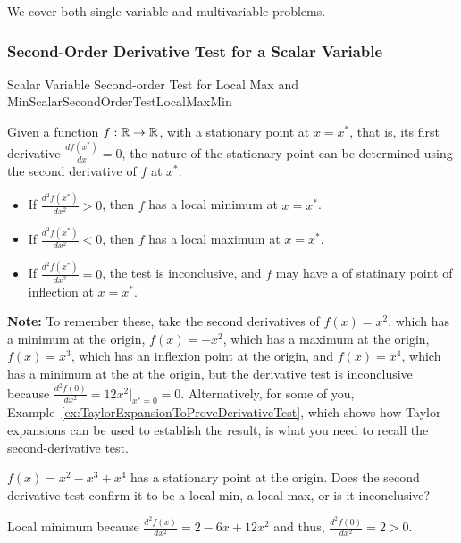 We cover both single-variable and multivariable problems.


\subsubsection{Second-Order Derivative Test for a Scalar Variable}

\begin{propColor}{Scalar Variable Second-order Test for Local Max and Min}{ScalarSecondOrderTestLocalMaxMin}

Given a function $f:\mathbb R \to \mathbb R$, with a stationary point at \(x = x^\ast\), that is, its first derivative $\frac{df(x^\ast)}{dx} = 0$, the nature of the stationary point can be determined using the second derivative of \(f\) at \(x^\ast\).

\begin{itemize}
    \item If \(\frac{d^2f(x^\ast)}{dx^2} > 0\), then \(f\) has a local minimum at \(x = x^\ast\).
    \item If \(\frac{d^2f(x^\ast)}{dx^2} < 0\), then \(f\) has a local maximum at \(x = x^\ast\).
    \item If \(\frac{d^2f(x^\ast)}{dx^2} = 0\), the test is inconclusive, and \(f\) may have a of statinary point of inflection at \(x = x^\ast\).
\end{itemize}
\bigskip
\textbf{Note:} To remember these, take the second derivatives of $f(x) = x^2$, which has a minimum at the origin, $f(x) = -x^2$, which has a maximum at the origin, $f(x) = x^3$, which has an inflexion point at the origin, and  $f(x) = x^4$, which has a minimum at the at the origin, but the derivative test is inconclusive because $\frac{d^2f(0)}{dx^2} = 12 x^2\big|_{x^\ast = 0} = 0$. Alternatively, for some of you, Example~\ref{ex:TaylorExpansionToProveDerivativeTest}, which shows how Taylor expansions can be used to establish the result, is what you need to recall the second-derivative test.
    
\end{propColor}

\bigskip

\begin{example} \(f(x) = x^2 -x^3 + x^4\) has a stationary point at the origin.
Does the second derivative test confirm it to be a local min, a local max, or is it inconclusive?    
\end{example}
\solution \Ans Local minimum because $\frac{d^2f(x)}{dx^2} = 2 -6x + 12x^2$ and thus, $\frac{d^2f(0)}{dx^2} = 2>0$.
\Qed
\bigskip

